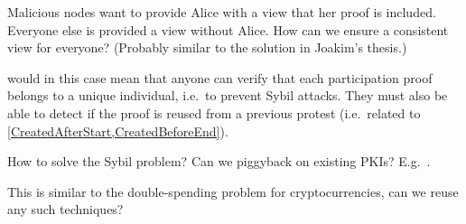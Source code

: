 \begin{frame}

  \pause

  \begin{question}
    Malicious nodes want to provide Alice with a view that her proof is 
    included.
    Everyone else is provided a view without Alice.
    How can we ensure a consistent view for everyone?
    (Probably similar to the solution in Joakim's thesis.)
  \end{question}
\end{frame}

 would in this case mean that anyone can verify that 
each participation proof belongs to a unique individual, i.e.\ to prevent Sybil 
attacks.
They must also be able to detect if the proof is reused from a previous protest 
(i.e.\ related to \cref{CreatedAfterStart,CreatedBeforeEnd}).

\begin{frame}

  \pause

  \begin{question}
    How to solve the Sybil problem?
    Can we piggyback on existing \acp{PKI}?
    E.g.~\cite{Cinderella}.
  \end{question}
  \begin{question}
    This is similar to the double-spending problem for cryptocurrencies, can 
    we reuse any such techniques?
  \end{question}
\end{frame}

